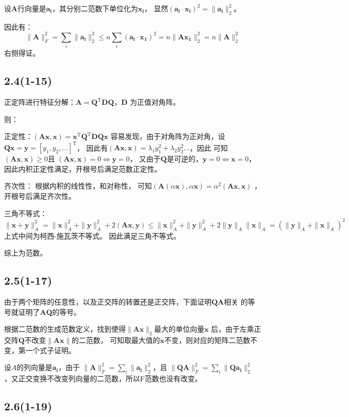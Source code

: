 \documentclass[UTF8,zihao=5]{ctexart}
\newcommand{\bm}[1]{{\mathbf{#1}}}
\newcommand{\trans}[0]{^\mathrm{T}}
\begin{document}
设$\bm{A}$行向量是$\bm{a_i}$，其分别二范数下单位化为$\bm{x_i}$，
显然$(\bm{a_i}\cdot\bm{x_i})^2=\|\bm{a_i}\|_2^2$。

因此有：
$$
\|\bm{A}\|_F^2=\sum_i{\|\bm{a_i}\|_2^2}
\leq n \sum_i{(\bm{a_i}\cdot\bm{x_1})^2}=n\|\bm{A}\bm{x_1}\|_2^2
=n\|\bm{A}\|_2^2
$$
右侧得证。

\subsection*{2.4(1-15)}

正定阵进行特征分解：$\bm{A}=\bm{Q}\trans\bm{DQ}$，$\bm{D}$
为正值对角阵。

则：

正定性：$(\bm{Ax},\bm{x})=\bm{x}\trans\bm{Q}\trans\bm{DQx}$
容易发现，由于对角阵为正对角，设$\bm{Qx}=\bm{y}=[y_1,y_2,...]\trans$，
因此有$(\bm{Ax},\bm{x})=\lambda_1y_1^2+\lambda_2y_2^2...$，因此
可知$(\bm{Ax},\bm{x})\geq 0 $且
$(\bm{Ax},\bm{x})=0 \Leftrightarrow \bm{y}=0 $，
又由于$\bm{Q}$是可逆的，$\bm{y}=0\Leftrightarrow\bm{x}=0$，
因此内积正定性满足，开根号后满足范数正定性。


齐次性：
根据内积的线性性，和对称性，
可知$(\bm{A}(\alpha \bm{x}),\alpha\bm{x})=\alpha^2(\bm{Ax},\bm{x})$
，开根号后满足齐次性。

三角不等式：
$$
\|\bm{x+y}\|^2_A=\|\bm{x}\|^2_A+\|\bm{y}\|^2_A+2(\bm{Ax},\bm{y})
\leq\|\bm{x}\|^2_A+\|\bm{y}\|^2_A+2\|\bm{y}\|_A\|\bm{x}\|_A
=(\|\bm{y}\|_A+\|\bm{x}\|_A)^2
$$
上式中间为柯西-施瓦茨不等式。
因此满足三角不等式。

综上为范数。

\subsection*{2.5(1-17)}

由于两个矩阵的任意性，以及正交阵的转置还是正交阵，下面证明$\bm{QA}$相关
的等号就证明了$\bm{AQ}$的等号。

根据二范数的生成范数定义，找到使得$\|\bm{Ax}\|_2$最大的单位向量$\bm{x}$
后，由于左乘正交阵$\bm{Q}$不改变$\|\bm{Ax}\|$的二范数，
可知取最大值的$\bm{x}$不变，则对应的矩阵二范数不变，第一个式子证明。

设$A$的列向量是$\bm{a_i}$，由于
$\|\bm{A}\|_F^2=\sum_i\|\bm{a_i}\|_2^2$，且
$\|\bm{QA}\|_F^2=\sum_i\|\bm{Qa_i}\|_2^2$
，又正交变换不改变列向量的二范数，所以F范数也没有改变。

\subsection*{2.6(1-19)}
\end{document}
